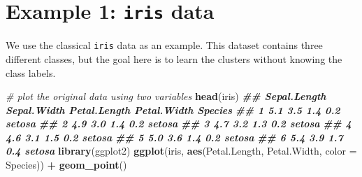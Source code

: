 \documentclass[
]{book}
\newenvironment{Shaded}{\begin{snugshade}}{\end{snugshade}}
\newcommand{\AttributeTok}[1]{\textcolor[rgb]{0.13,0.29,0.53}{#1}}
\newcommand{\CommentTok}[1]{\textcolor[rgb]{0.56,0.35,0.01}{\textit{#1}}}
\newcommand{\DecValTok}[1]{\textcolor[rgb]{0.00,0.00,0.81}{#1}}
\newcommand{\DocumentationTok}[1]{\textcolor[rgb]{0.56,0.35,0.01}{\textbf{\textit{#1}}}}
\newcommand{\FunctionTok}[1]{\textcolor[rgb]{0.13,0.29,0.53}{\textbf{#1}}}
\newcommand{\NormalTok}[1]{#1}
\newcommand{\OtherTok}[1]{\textcolor[rgb]{0.56,0.35,0.01}{#1}}
\newcommand{\SpecialCharTok}[1]{\textcolor[rgb]{0.81,0.36,0.00}{\textbf{#1}}}
\theoremstyle{definition}
\theoremstyle{definition}
\theoremstyle{definition}
\theoremstyle{definition}
\theoremstyle{remark}
\begin{document}
\begin{Shaded}
\end{Shaded}

\hypertarget{example-1-iris-data}{%
\section{\texorpdfstring{Example 1: \texttt{iris} data}{Example 1: iris data}}\label{example-1-iris-data}}

We use the classical \texttt{iris} data as an example. This dataset contains three different classes, but the goal here is to learn the clusters without knowing the class labels.

\begin{Shaded}
\begin{Highlighting}[]
    \CommentTok{\# plot the original data using two variables}
    \FunctionTok{head}\NormalTok{(iris)}
\DocumentationTok{\#\#   Sepal.Length Sepal.Width Petal.Length Petal.Width Species}
\DocumentationTok{\#\# 1          5.1         3.5          1.4         0.2  setosa}
\DocumentationTok{\#\# 2          4.9         3.0          1.4         0.2  setosa}
\DocumentationTok{\#\# 3          4.7         3.2          1.3         0.2  setosa}
\DocumentationTok{\#\# 4          4.6         3.1          1.5         0.2  setosa}
\DocumentationTok{\#\# 5          5.0         3.6          1.4         0.2  setosa}
\DocumentationTok{\#\# 6          5.4         3.9          1.7         0.4  setosa}
    \FunctionTok{library}\NormalTok{(ggplot2)}
    \FunctionTok{ggplot}\NormalTok{(iris, }\FunctionTok{aes}\NormalTok{(Petal.Length, Petal.Width, }\AttributeTok{color =}\NormalTok{ Species)) }\SpecialCharTok{+} \FunctionTok{geom\_point}\NormalTok{()}
\end{Highlighting}
\end{Shaded}
\end{document}

